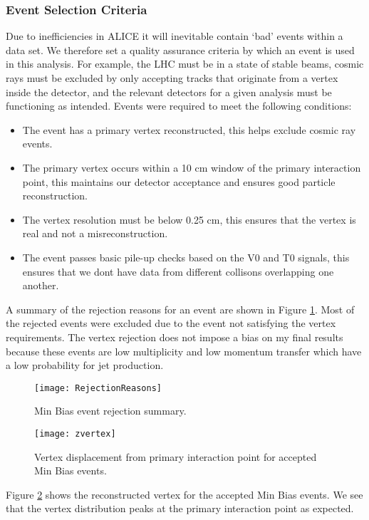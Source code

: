 \subsubsection{Event Selection Criteria}
Due to inefficiencies in ALICE it will inevitable contain `bad' events within a data set.  We therefore set a quality assurance criteria by which an event is used in this analysis.  For example, the LHC must be in a state of stable beams, cosmic rays must be excluded by only accepting tracks that originate from a vertex inside the detector, and the relevant detectors for a given analysis must be functioning as intended.  Events were required to meet the following conditions:

\begin{itemize}
  \item The event has a primary vertex reconstructed, this helps exclude cosmic ray events.
  \item The primary vertex occurs within a 10 cm window of the primary interaction point, this maintains our detector acceptance and ensures good particle reconstruction.
  \item The vertex resolution must be below 0.25 cm, this ensures that the vertex is real and not a misreconstruction.
  \item The event passes basic pile-up checks based on the V0 and T0 signals, this ensures that we dont have data from different collisons overlapping one another.
\end{itemize}


A summary of the rejection reasons for an event are shown in Figure \ref{fig:eventqa}.  Most of the rejected events were excluded due to the event not satisfying the vertex requirements.  The vertex rejection does not impose a bias on my final results because these events are low multiplicity and low momentum transfer which have a low probability for jet production.

\begin{figure}[h]
\texttt{[image: RejectionReasons]}
\centering
\caption{Min Bias event rejection summary.}
\label{fig:eventqa}
\end{figure}

\begin{figure}[h]
\texttt{[image: zvertex]}
\centering
\caption{Vertex displacement from primary interaction point for accepted Min Bias events.}
\label{fig:vertrec}
\end{figure}


Figure \ref{fig:vertrec} shows the reconstructed vertex for the accepted Min Bias events.  We see that the vertex distribution peaks at the primary interaction point as expected. 

